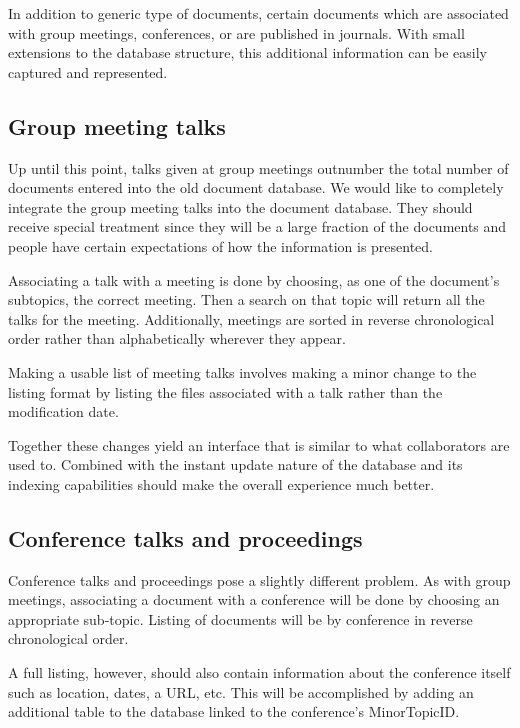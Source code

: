 \documentclass[12pt]{article}
\begin{document}
In addition to generic type of documents, certain documents which are
associated with group meetings, conferences, or are published in journals. With
small extensions to the database structure, this additional information can be
easily captured and represented.

\subsection{Group meeting talks}

Up until this point, talks given at group meetings outnumber the total number
of documents entered into the old document database. We would like to
completely integrate the group meeting talks into the document database. They
should receive special treatment since they will be a large fraction of the
documents and people have certain expectations of how the information is
presented.

Associating a talk with a meeting is done by choosing, as one of the document's
subtopics, the correct meeting. Then a search on that topic will return all the
talks for the meeting. Additionally, meetings are sorted in reverse
chronological order rather than alphabetically wherever they appear.

Making a usable list of meeting talks involves making a minor change to the
listing format by listing the files associated with a talk rather than the
modification date. 

Together these changes yield an interface that is similar to what collaborators
are used to. Combined with the instant update nature of the database and its
indexing capabilities should make the overall experience much better.

\subsection{Conference talks and proceedings}

Conference talks and proceedings pose a slightly different problem. As with
group meetings, associating a document with a conference will be done by
choosing an appropriate sub-topic. Listing of documents will be by conference
in reverse chronological order. 

A full listing, however, should also contain information about the conference
itself such as location, dates, a URL, etc. This will be accomplished by adding
an additional table to the database linked to the conference's MinorTopicID.
\end{document}

